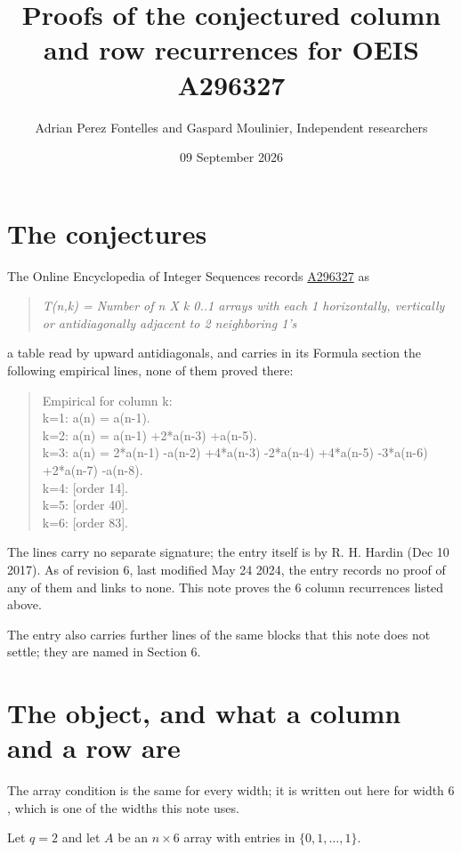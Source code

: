 \documentclass[11pt]{article}
\title{Proofs of the conjectured column and row recurrences for OEIS A296327}
\author{Adrian Perez Fontelles and Gaspard Moulinier, Independent researchers}
\date{09 September 2026}
\theoremstyle{definition}
\begin{document}
\maketitle
\section{The conjectures}

The Online Encyclopedia of Integer Sequences records \href{https://oeis.org/A296327}{A296327} as

\begin{quote}\itshape T(n,k) = Number of n X k 0..1 arrays with each 1 horizontally, vertically or antidiagonally adjacent to 2 neighboring 1's\end{quote}

a table read by upward antidiagonals, and carries in its Formula section the following empirical lines, none of them proved there:

\begin{quote}\ttfamily Empirical for column k:\\
k=1: a(n) = a(n-1).\\k=2: a(n) = a(n-1) +2*a(n-3) +a(n-5).\\k=3: a(n) = 2*a(n-1) -a(n-2) +4*a(n-3) -2*a(n-4) +4*a(n-5) -3*a(n-6) +2*a(n-7) -a(n-8).\\k=4: [order 14].\\k=5: [order 40].\\k=6: [order 83].\end{quote}

The lines carry no separate signature; the entry itself is by R. H. Hardin (Dec 10 2017). As of revision 6, last modified May 24 2024, the entry records no proof of any of them and links to none. This note proves the 6 column recurrences listed above.

The entry also carries further lines of the same blocks that this note does not settle; they are named in Section 6.

\section{The object, and what a column and a row are}

The array condition is the same for every width; it is written out here for width $6$, which is one of the widths this note uses.

Let $q = 2$ and let $A$ be an $n \times 6$ array with entries in $\{0,1,\dots,1\}$.
\end{document}

